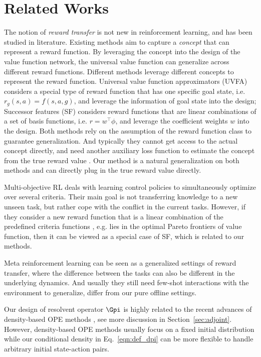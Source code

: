 \section{Related Works}

The notion of \textit{reward transfer} is not new in reinforcement learning, and has been studied in literature.
Existing methods aim to capture a \textit{concept} that can represent a reward function.
By leveraging the concept into the design of the value function network, the universal value function can generalize across different reward functions.
Different methods leverage different concepts to represent the reward function.
Universal value function approximators (UVFA) \citep{schaul2015universal} considers a special type of reward function that has one specific goal state, i.e. $r_g(s,a) = f(s,a, g)$,
and leverage the information of goal state into the design;
Successor features (SF) \citep{barreto2017successor,barreto2018transfer,borsa2018universal, barreto2020fast} considers reward functions that are linear combinations of a set of basis functions, i.e. $r = w^\top \phi$,
and leverage the coefficient weights $w$ into the design.
Both methods rely on the assumption of the reward function class to guarantee generalization.
And typically they cannot get access to the actual concept directly, 
and need another auxiliary loss function to estimate the concept from the true reward value \citep{kulkarni2016deep}.
Our method is a natural generalization on both methods and can directly plug in the true reward value directly.

Multi-objective RL \citep[e.g.][]{roijers2013survey,van2014multi, li2019multi, yu2020gradient} 
deals with learning control policies to simultaneously optimize over several criteria.
Their main goal is not transferring knowledge to a new unseen task, but rather cope with the conflict in the current tasks.
However, if they consider a new reward function that is a linear combination of the predefined criteria functions \citep{yang2019generalized}, e.g. lies in the optimal Pareto frontiers of value function, then it can be viewed as a special case of SF, which is related to our methods.

Meta reinforcement learning \citep[e.g.,][]{duan2016rl, finn2017model, nichol2018first, xu2018meta, rakelly2019efficient, Zintgraf2020VariBAD} can be seen as a generalized settings of reward transfer, where the difference between the tasks can also be different in the underlying dynamics. 
And usually they still need few-shot interactions with the environment to generalize, differ from our pure offline settings.


Our design of resolvent operator $\Gpi$ is highly related to the recent advances of density-based OPE 
methods \citep[e.g.,][]{liu2018breaking, nachum2019dualdice, tang2019doubly,mousavi2019black, zhang2020gendice,zhang2020gradientdice}, see more discussion in Section~\ref{sec:adjoint}.
However, density-based OPE methods usually focus on a fixed initial distribution 
while our conditional density in Eq.~\eqref{eqn:def_dpi} can be more flexible to handle arbitrary initial state-action pairs.
